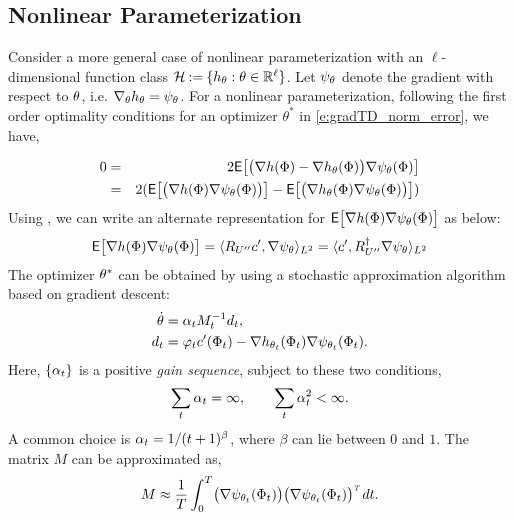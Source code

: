 \subsection{Nonlinear Parameterization}
Consider a more general case of nonlinear parameterization with an $\ell$- dimensional function class ${\cal H} \mathbin{:=} \{h_\theta : \theta \in \mathbb{R}^\ell\}$. Let $\psi_\theta$ denote the gradient with respect to $\theta$, i.e. $\nabla_\theta h_\theta = \psi_\theta$. For a nonlinear parameterization, following the first order optimality conditions for an optimizer $\theta^{*}$ in \eqref{e:gradTD_norm_error}, we have,

\begin{eqnarray*}
	0 & = &2 {\sf E} \bigl[\bigl(\nabla h(\Phi) - \nabla h_\theta (\Phi)\bigr) \nabla \psi_\theta (\Phi)\bigr]\\
	& = & 2 ({\sf E} \bigl[\bigl(\nabla h(\Phi)\nabla \psi_\theta (\Phi)\bigr)\bigr] - {\sf E} \bigl[\bigl(\nabla h_\theta (\Phi)\nabla \psi_\theta (\Phi)\bigr)\bigr])
\end{eqnarray*}
Using , we can write an alternate representation for ${\sf E} \bigl[ \nabla h(\Phi)\nabla \psi_\theta (\Phi)\bigr]$ as below:
\begin{eqnarray*}
	{\sf E}\bigl[\nabla h(\Phi)\nabla \psi_\theta (\Phi)\bigr]=\langle R_{U''}c',\nabla \psi_\theta\rangle_{L^2} =\langle c', R_{U''}^\dagger \nabla \psi_\theta\rangle_{L^2}
\end{eqnarray*}
The optimizer $\theta^*$ can be obtained by using a stochastic approximation algorithm based on gradient descent: %
\begin{equation*}
\begin{aligned}
\dot{\theta}&=\alpha_t M_{t}^{-1} d_t, \\ 
d_t & =\varphi_t  c'(\Phi_t)-\nabla h_{\theta_{t}}(\Phi_t)\nabla \psi_{\theta_{t}}(\Phi_t).
\end{aligned}
\end{equation*}
Here, $\{\alpha_t\}$ is a positive \textit{gain sequence}, subject to these two conditions, 
\begin{equation}
\sum_t \alpha_t = \infty, \qquad \sum_t \alpha_t^2 < \infty.
\end{equation}
A common choice is $\alpha_t = 1/(t+1)^\beta$, where $\beta$ can lie between $0$ and $1$. The matrix $M$ can be approximated as,
\begin{equation}
M \approx \frac{1}{T}\int_0^T\bigl(\gradbasis_{\param_t}(\markovstate_t)\bigr)\bigl(\gradbasis_{\param_t}(\markovstate_t)\bigr)^{\transpose}\, dt.
\label{e:gradTD_M_int}
\end{equation}

